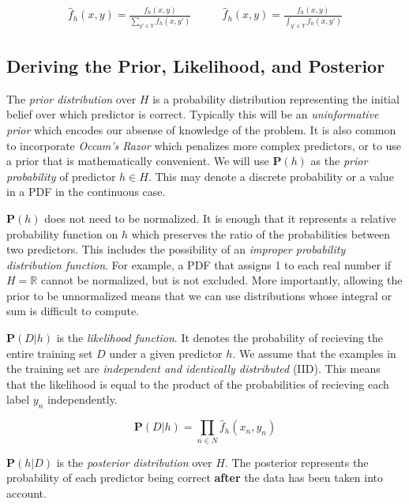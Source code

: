 \documentclass[twoside]{article}
\begin{document}
\begin{align}
\label{eq:normalized_probability_model}
\hat{f}_h(x, y)=\frac{f_h(x, y)}{\sum_{y' \in Y} f_h(x,y')} &
\qquad\hat{f}_h(x, y)=\frac{f_h(x, y)}{\int_{y' \in Y} f_h(x,y')}
\end{align}

\subsection{Deriving the Prior, Likelihood, and Posterior}

The \textit{prior distribution} over \(H\) is a probability distribution representing the initial belief over which predictor is correct. Typically this will be an \textit{uninformative prior} which encodes our absense of knowledge of the problem. It is also common to incorporate \textit{Occam's Razor} which penalizes more complex predictors, or to use a prior that is mathematically convenient. We will use \(\mathbf{P}(h)\) as the \textit{prior probability} of predictor \(h \in H\). This may denote a discrete probability or a value in a PDF in the continuous case.

\(\mathbf{P}(h)\) does not need to be normalized. It is enough that it represents a relative probability function on \(h\) which preserves the ratio of the probabilities between two predictors. This includes the possibility of an \textit{improper probability distribution function}. For example, a PDF that assigns 1 to each real number if \(H=\mathbb{R}\) cannot be normalized, but is not excluded. More importantly, allowing the prior to be unnormalized means that we can use distributions whose integral or sum is difficult to compute.

\(\mathbf{P}(D|h)\) is the \textit{likelihood function}. It denotes the probability of recieving the entire training set \(D\) under a given predictor \(h\). We assume that the examples in the training set are \textit{independent and identically distributed} (IID). This means that the likelihood is equal to the product of the probabilities of recieving each label \(y_n\) independently.

\begin{equation}
\label{eq:likelihood_expansion}
\mathbf{P}(D|h)=\prod_{n \in N} \hat{f}_h(x_n,y_n)
\end{equation}

\(\mathbf{P}(h|D)\) is the \textit{posterior distribution} over \(H\). The posterior represents the probability of each predictor being correct \textbf{after} the data has been taken into account.
\end{document}
